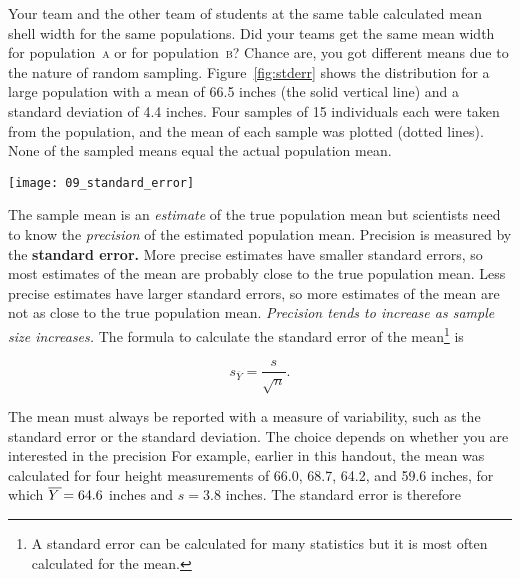 \documentclass[12pt]{exam}
\newcommand*\meanY{\overline{Y\kern1.67pt}\kern-1.67pt}
\newcommand*\meansubY{\overline{Y}}
\newcommand*\popa{population~\textsc{a}} %
\newcommand*\popb{population~\textsc{b}} %
\begin{document}
\begin{questions}
Your team and the other team of students at the same table calculated mean shell width for the same populations. Did your teams get the same mean width for \popa{} or for \popb{}? Chance are, you got different means due to the nature of random sampling.
Figure~\ref{fig:stderr} shows the distribution for a large population with a mean of 66.5 inches (the solid vertical line) and a standard deviation of 4.4 inches. Four samples of 15 individuals each were taken from the population, and the mean of each sample was plotted (dotted lines). None of the sampled means equal the actual population mean.

\hfil\begin{minipage}{0.8\textwidth}
	\texttt{[image: 09\_standard\_error]}
\end{minipage}\hfill

\bigskip

The sample mean is an \emph{estimate} of the true population mean but scientists 
need to know the \emph{precision} of the estimated population mean. Precision 
is measured by the \textbf{standard error.} More precise estimates have smaller 
standard errors, so most estimates of the mean are probably close to the true population mean. Less precise estimates have larger standard errors, so more estimates of the mean are not as close to the true population mean. \emph{Precision tends to increase as sample size increases.} The formula to calculate the standard error of the mean\footnote{A standard error can be calculated for many statistics but it is most often calculated for the mean.} is

\[ s_{\meansubY} = \frac{s}{\sqrt{n}}. \]

The mean must always be reported with a measure of variability, such as the standard error
or the standard deviation. The choice depends on whether you are interested in the precision 
For example, earlier in this handout, the mean was calculated for four height measurements 
of 66.0, 68.7, 64.2, and 59.6 inches, for which $\meanY = 64.6$ inches and $s=3.8$ inches. 
The standard error is therefore


\end{questions}
\end{document}
